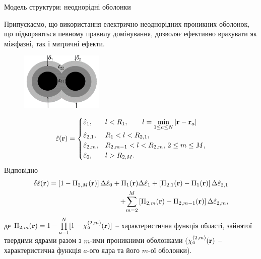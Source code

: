 \documentclass[10pt]{beamer}
\begin{document}
\begin{frame}{Модель структури: неоднорідні оболонки}


\footnotesize
Припускаємо, що використання електрично неоднорідних проникних оболонок, що підкоряються певному правилу домінування, дозволяє ефективно врахувати як міжфазні, так і матричні ефекти.

\begin{figure}
\vspace{-20pt}
  \begin{center}
    \includegraphics[width=0.35\textwidth]{images/2shell.png}
  \end{center}
\vspace{-25pt}
\end{figure}
\begin{equation*}\label{eq:distr1}
\hat{\varepsilon}({\bf r})=\begin{cases}
\hat{\varepsilon}_1, & l<R_1, \qquad l=\min\limits_{1 \leq a \leq N} |{\bf r} - {\bf r}_a| \\
\hat{\varepsilon}_{2,1}, &  R_1<l<R_{2,1},\\
{\hat{\varepsilon}_{2,m}}, & { R_{2,m-1}<l<R_{2,m}, \,2 \leq m \leq M},\\
\hat{\varepsilon}_0, & l>R_{2,M}.
\end{cases}
\end{equation*}
Відповідно
\begin{equation*}
\begin{split}
\delta\hat{\varepsilon} ({\bf r}) = \left[1- \Pi_{2,M}({\bf
r})\right] \Delta\hat{\varepsilon}_0
+ \Pi_1({\bf r}) \Delta\hat{\varepsilon}_1
+  \left[\Pi_{2,1}({\bf r})
-\Pi_1({\bf r})  \right] \Delta\hat{\varepsilon}_{2,1} \\
+ {\sum\limits_{m=2}^M  \left[ \Pi_{2,m}({\bf r}) -
\Pi_{2,m-1}({\bf r}) \right] \Delta\hat{\varepsilon}_{2,m}},
\end{split}
\end{equation*}
де $\Pi_{2,m} ({\bf r}) = 1 - \prod\limits_{a=1}^N [1 - \chi_a^{(2,m)} ({\bf r})]$ -- характеристична функція області, зайнятої твердими ядрами разом з $m$-ими проникними оболонками ($\chi_a^{(2,m)}({\bf r})$ -- характеристична функція $a$-ого ядра та його $m$-ої оболонки).


\end{frame}
\end{document}

